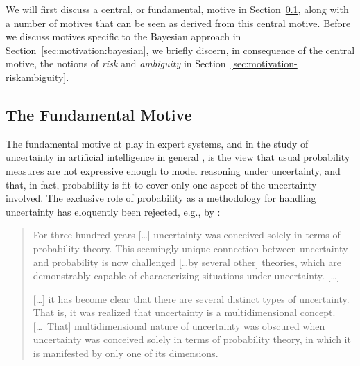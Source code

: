 We will first discuss a central, or fundamental, motive in Section~\ref{sec:motivation-fundamental},
along with a number of motives that can be seen as derived from this central motive.
Before we discuss motives specific to the Bayesian approach in Section~\ref{sec:motivation:bayesian},
we briefly discern, in consequence of the central motive, the notions of \emph{risk} and \emph{ambiguity}
in Section~\ref{sec:motivation-riskambiguity}.

\subsection{The Fundamental Motive}
\label{sec:motivation-fundamental}

The fundamental motive at play in expert systems,
and in the study of uncertainty in artificial intelligence in general \parencite[see, e.g.,][]{2006:lawry},
is the view that usual probability measures
are not expressive enough to model reasoning under uncertainty,
and that, in fact, probability is fit to cover only one aspect of the uncertainty involved.
The exclusive role of probability as a methodology for handling uncertainty has eloquently been rejected,
e.g., by \textcite[p.~1]{1999:klir}: 
\begin{quotation}
\begin{small}
For three hundred years [\ldots] uncertainty was conceived solely in
terms of probability theory. This seemingly unique connection
between uncertainty and probability is now challenged [\ldots by several
other] theories, which are demonstrably capable of characterizing
situations under uncertainty. [\ldots]

[\ldots] it has become clear that there are several distinct types of
uncertainty. That is, it was realized that uncertainty is a
multidimensional concept. [\ldots\ That] multidimensional nature of
uncertainty was obscured when uncertainty was conceived solely in
terms of probability theory, in which it is manifested by only one
of its dimensions.
\end{small}
\end{quotation}

